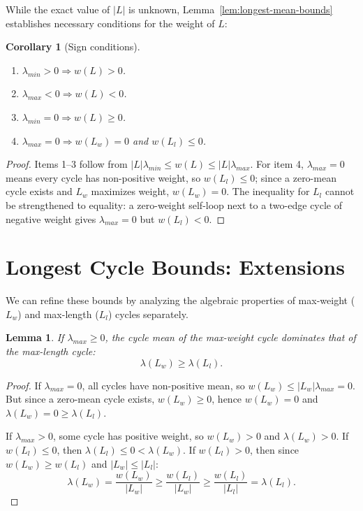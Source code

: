 \documentclass{article}
\newtheorem{lem}{Lemma}[section]
\newtheorem{cor}{Corollary}[section]
\theoremstyle{definition}
\begin{document}
While the exact value of $|L|$ is unknown,
Lemma~\ref{lem:longest-mean-bounds} establishes necessary conditions
for the weight of $L$:
\begin{cor}[Sign conditions]
  \label{cor:sign-conditions}
\mbox{}\par
\begin{enumerate}
  \item $\lambda_{min} > 0 \Rightarrow w(L) > 0$.
  \item $\lambda_{max} < 0 \Rightarrow w(L) < 0$.
  \item $\lambda_{min} = 0 \Rightarrow w(L) \geq 0$.
  \item $\lambda_{max} = 0 \Rightarrow w(L_w) = 0$ and $w(L_l) \leq 0$.
\end{enumerate}
\end{cor}

\begin{proof}
Items 1--3 follow from $|L|\lambda_{min} \leq w(L) \leq
|L|\lambda_{max}$. For item 4, $\lambda_{max} = 0$ means every cycle
has non-positive weight, so $w(L_l) \leq 0$; since a zero-mean cycle
exists and $L_w$ maximizes weight, $w(L_w) = 0$. The inequality for
$L_l$ cannot be strengthened to equality: a zero-weight self-loop next
to a two-edge cycle of negative weight gives $\lambda_{max} = 0$ but
$w(L_l) < 0$.
\end{proof}

\section{Longest Cycle Bounds: Extensions}
\label{sec:extensions}

We can refine these bounds by analyzing the algebraic properties of
max-weight ($L_w$) and max-length ($L_l$) cycles separately.
\begin{lem}
\label{lem:mean_domination}
If $\lambda_{max} \geq 0$, the cycle mean of the max-weight cycle
dominates that of the max-length cycle:
\begin{equation}
  \lambda(L_{w}) \geq \lambda(L_{l}).
\end{equation}
\end{lem}
\begin{proof}
If $\lambda_{max} = 0$, all cycles have non-positive mean, so $w(L_w)
\leq |L_w| \lambda_{max} = 0$. But since a zero-mean cycle exists,
$w(L_w) \geq 0$, hence $w(L_w) = 0$ and $\lambda(L_w) = 0 \geq
\lambda(L_l)$.

If $\lambda_{max} > 0$, some cycle has positive weight, so $w(L_w) >
0$ and $\lambda(L_w) > 0$. If $w(L_l) \leq 0$, then $\lambda(L_l) \leq
0 < \lambda(L_w)$. If $w(L_l) > 0$, then since $w(L_w) \geq w(L_l)$
and $|L_w| \leq |L_l|$:
$$ \lambda(L_{w}) = \frac{w(L_{w})}{|L_{w}|} \geq
\frac{w(L_{l})}{|L_{w}|} \geq \frac{w(L_{l})}{|L_{l}|} =
\lambda(L_{l}). $$
\end{proof}
\end{document}
